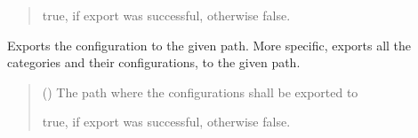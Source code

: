 \documentclass[letterpaper,10pt,english]{sphinxmanual}
\begin{document}
\begin{fulllineitems}
\begin{fulllineitems}
\begin{quote}
\begin{description}
\sphinxAtStartPar
true, if export was successful, otherwise false.

\sphinxAtStartPar
{}

\end{description}\end{quote}

\end{fulllineitems}


\begin{fulllineitems}
\label{\detokenize{apidoc/src.osm_configurator.model.application:src.osm_configurator.model.application.application_interface.IApplication.export_configuration}}
\pysigstartsignatures
{}
\pysigstopsignatures
\sphinxAtStartPar
Exports the configuration to the given path. More specific, exports all the categories and their configurations,
to the given path.
\begin{quote}\begin{description}
\sphinxAtStartPar
{} () \textendash{} The path where the configurations shall be exported to

\sphinxAtStartPar
true, if export was successful, otherwise false.

\sphinxAtStartPar
{}

\end{description}\end{quote}

\end{fulllineitems}



\end{fulllineitems}
\end{document}
